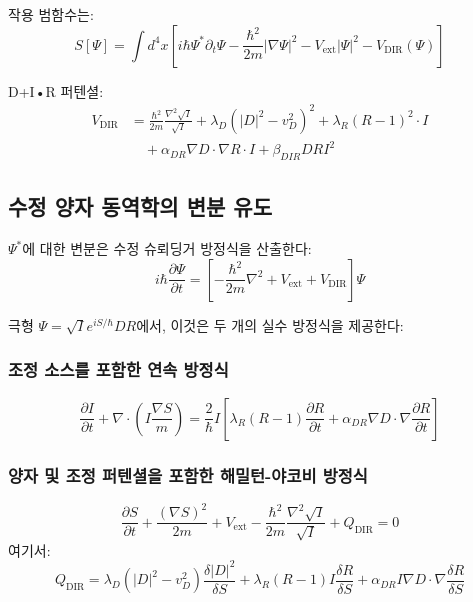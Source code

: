 \documentclass[11pt,a4paper]{article}
\begin{document}
작용 범함수는:
\begin{equation}
S[\Psi] = \int d^4x \left[ i\hbar \Psi^* \partial_t \Psi - \frac{\hbar^2}{2m} |\nabla \Psi|^2 - V_{\text{ext}} |\Psi|^2 - V_{\text{DIR}}(\Psi) \right]
\end{equation}

D+I•R 퍼텐셜:
\begin{align}
V_{\text{DIR}} &= \frac{\hbar^2}{2m} \frac{\nabla^2 \sqrt{I}}{\sqrt{I}} 
+ \lambda_D (|D|^2 - v_D^2)^2 
+ \lambda_R (R - 1)^2 \cdot I \\
&\quad + \alpha_{DR} \nabla D \cdot \nabla R \cdot I 
+ \beta_{DIR} D R I^2
\end{align}

\subsection{수정 양자 동역학의 변분 유도}

$\Psi^*$에 대한 변분은 수정 슈뢰딩거 방정식을 산출한다:
\begin{equation}
i\hbar \frac{\partial \Psi}{\partial t} = \left[ -\frac{\hbar^2}{2m} \nabla^2 + V_{\text{ext}} + V_{\text{DIR}} \right] \Psi
\end{equation}

극형 $\Psi = \sqrt{I} e^{iS/\hbar} D R$에서, 이것은 두 개의 실수 방정식을 제공한다:

\subsubsection{조정 소스를 포함한 연속 방정식}
\begin{equation}
\frac{\partial I}{\partial t} + \nabla \cdot \left( I \frac{\nabla S}{m} \right) = \frac{2}{\hbar} I \left[ \lambda_R (R-1) \frac{\partial R}{\partial t} + \alpha_{DR} \nabla D \cdot \nabla \frac{\partial R}{\partial t} \right]
\end{equation}

\subsubsection{양자 및 조정 퍼텐셜을 포함한 해밀턴-야코비 방정식}
\begin{equation}
\frac{\partial S}{\partial t} + \frac{(\nabla S)^2}{2m} + V_{\text{ext}} - \frac{\hbar^2}{2m} \frac{\nabla^2 \sqrt{I}}{\sqrt{I}} + Q_{\text{DIR}} = 0
\end{equation}
여기서:
\begin{equation}
Q_{\text{DIR}} = \lambda_D (|D|^2 - v_D^2) \frac{\delta |D|^2}{\delta S} 
+ \lambda_R (R-1) I \frac{\delta R}{\delta S}
+ \alpha_{DR} I \nabla D \cdot \nabla \frac{\delta R}{\delta S}
\end{equation}
\end{document}
